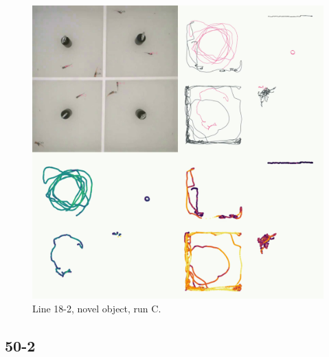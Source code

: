 \documentclass[
]{book}
\begin{document}
\begin{figure}
\includegraphics[width=1\linewidth]{figs/mikk_behaviour/four_panel_plots/novel_object_20191119_1459_18-2_R_C_300} \caption{Line 18-2, novel object, run C.}\label{fig:4p-18-2-no-C}
\end{figure}

\hypertarget{section-8}{%
\subsection{50-2}\label{section-8}}
\end{document}
